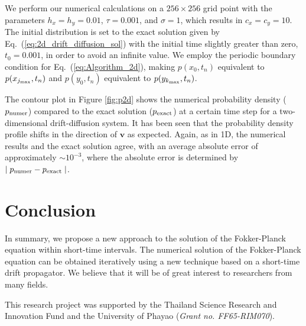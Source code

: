 \documentclass[aps,pre,reprint,superscriptaddress,showpacs,amsmath
,floatfix
]{revtex4-2}
\renewcommand{\vec}[1]{\boldsymbol{#1}}
\newcommand{\eq}[1]{Eq.~(\ref{#1})}
\begin{document}
We perform our numerical calculations on a $256\times 256$ grid point with the parameters $h_x=h_y=0.01$, $\tau=0.001$, and $\sigma=1$, which results in $c_x=c_y=10$. The initial distribution is set to the exact solution given by \eq{eq:2d_drift_diffusion_sol} with the initial time slightly greater than zero, $t_0 = 0.001$, in order to avoid an infinite value. We employ the periodic boundary condition for \eq{eq:Algorithm_2d}, making $p(x_0,t_n)$ equivalent to $p(x_{j_\textnormal{max}}, t_n)$ and $p(y_0,t_n)$ equivalent to $p(y_{k_\textnormal{max}}, t_n)$. 

The contour plot in Figure \ref{fig:p2d} shows the numerical probability density ($p_\textnormal{numer}$) compared to the exact solution ($p_\textnormal{exact}$) at a certain time step for a two-dimensional drift-diffusion system. It has been seen that the probability density profile shifts in the direction of $\vec{v}$ as expected. Again, as in 1D, the numerical results and the exact solution agree, with an average absolute error of approximately $\sim 10^{-3}$, where the absolute error is determined by $\mid p_\textnormal{numer} - p_\textnormal{exact} \mid$.

\section{Conclusion}
In summary, we propose a new approach to the solution of the Fokker-Planck equation within short-time intervals. The numerical solution of the Fokker-Planck equation can be obtained iteratively using a new technique based on a short-time drift propagator. We believe that it will be of great interest to researchers from many fields.

\begin{acknowledgments}
This research project was supported by the Thailand Science Research and Innovation Fund and the University of Phayao (\emph{Grant no. FF65-RIM070}).
\end{acknowledgments}




\end{document}
